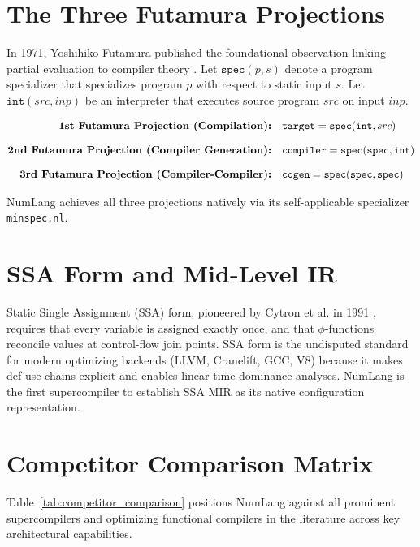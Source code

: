 \section{The Three Futamura Projections}
\label{sec:background:futamura}

In 1971, Yoshihiko Futamura published the foundational observation linking partial evaluation to compiler theory \citep{futamura1971partial}. Let $\mathtt{spec}(p, s)$ denote a program specializer that specializes program $p$ with respect to static input $s$. Let $\mathtt{int}(src, inp)$ be an interpreter that executes source program $src$ on input $inp$.

\begin{align}
\text{\bf 1st Futamura Projection (Compilation):} \quad & \mathtt{target} = \mathtt{spec}(\mathtt{int}, src) \\[0.8em]
\text{\bf 2nd Futamura Projection (Compiler Generation):} \quad & \mathtt{compiler} = \mathtt{spec}(\mathtt{spec}, \mathtt{int}) \\[0.8em]
\text{\bf 3rd Futamura Projection (Compiler-Compiler):} \quad & \mathtt{cogen} = \mathtt{spec}(\mathtt{spec}, \mathtt{spec})
\end{align}

NumLang achieves all three projections natively via its self-applicable specializer \texttt{minspec.nl}.

\section{SSA Form and Mid-Level IR}
\label{sec:background:ssa}

Static Single Assignment (SSA) form, pioneered by Cytron et al. in 1991 \citep{cytron1991efficiently}, requires that every variable is assigned exactly once, and that $\phi$-functions reconcile values at control-flow join points. SSA form is the undisputed standard for modern optimizing backends (LLVM, Cranelift, GCC, V8) because it makes def-use chains explicit and enables linear-time dominance analyses. NumLang is the first supercompiler to establish SSA MIR as its native configuration representation.

\section{Competitor Comparison Matrix}
\label{sec:background:comparison}

Table~\ref{tab:competitor_comparison} positions NumLang against all prominent supercompilers and optimizing functional compilers in the literature across key architectural capabilities.

